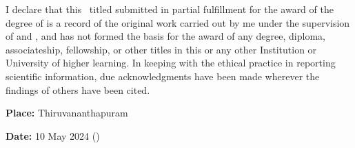 \begin{ThesisDeclaration}

\noindent I declare that this \Doctype \ titled \textbf{\textit{\Title}} submitted in partial fulfillment for the award of the degree of
{\bf\Degreetext} is a record of the original work carried out by me
under the supervision of \textbf{\FirstAdvisor} and \textbf{\SecondAdvisor}, and has not formed the basis for the award of any degree, diploma, associateship, fellowship, or other titles in this or any other Institution or University of higher learning. In keeping with the ethical practice in reporting scientific information, due acknowledgments have been made wherever the findings of others have been cited.

\vspace{35mm}

\noindent\textbf{Place: }Thiruvananthapuram \hfill \Author \hspace{2mm} 

\noindent\textbf{Date: }10 May 2024  \hfill (\Studentid) \hspace{7mm}

\end{ThesisDeclaration}